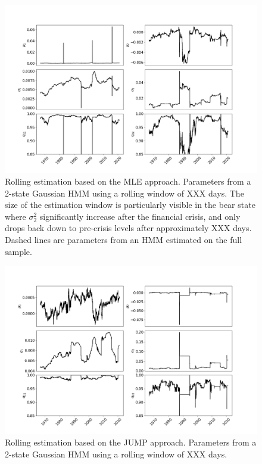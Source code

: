 \begin{figure}[H] 
    \centering
    \includegraphics[width=1.0\textwidth]{analysis/stylized_facts/images/2-state MLE HMM rolling params.png}
    \caption{Rolling estimation based on the MLE approach. Parameters from a 2-state Gaussian HMM using a rolling window of XXX days. The size of the estimation window is particularly visible in the bear state where $\sigma_2^2$ significantly increase after the financial crisis, and only drops back down to pre-crisis levels after approximately XXX days. Dashed lines are parameters from an HMM estimated on the full sample.}
    \label{fig: MLE estimation rolling parameters} 
\end{figure}

\begin{figure}[H] 
    \centering
    \includegraphics[width=1.0\textwidth]{analysis/stylized_facts/images/2-state JUMP HMM rolling params.png}
    \caption{Rolling estimation based on the JUMP approach. Parameters from a 2-state Gaussian HMM using a rolling window of XXX days.}
    \label{fig: Jump estimation rolling parameters} 
\end{figure}

